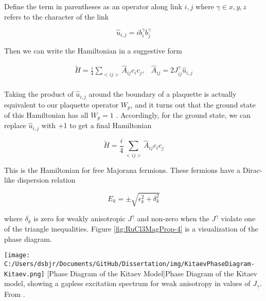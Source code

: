 Define the term in parentheses as an operator along link $i,j$ where $\gamma \in x,y,z$ refers to the character of the link

\begin{equation}
\hat{u}_{i,j} = i b_{i}^{\gamma} b_{j}^{\gamma}
\end{equation}

Then we can write the Hamiltonian in a suggestive form

\begin{equation}
\begin{array}{cc}
	\tilde{H} = \frac{i}{4} \sum_{<ij>} \hat{A}_{ij} c_{i} c_{j}, & \hat{A}_{ij} = 2 J^{\gamma}_{ij}\hat{u}_{i,j} \\
\end{array}
\end{equation}

Taking the product of $\hat{u}_{i,j}$ around the boundary of a plaquette is actually equivalent to our plaquette operator $W_{p}$, and it turns out that the ground state of this Hamiltonian has all $W_{p} = 1$ \cite{Lieb1994}. Accordingly, for the ground state, we can replace $\hat{u}_{i,j}$ with +1 to get a final Hamiltonian

\begin{equation}
\tilde{H} = \frac{i}{4} \sum_{<ij>} \hat{A}_{ij} c_{i} c_{j}
\end{equation}

This is the Hamiltonian for free Majorana fermions. These fermions have a Dirac-like dispersion relation

\begin{equation}
E_{k} = \pm \sqrt{\epsilon_{k}^{2} + \delta_{k}^{2}}
\end{equation}

where $\delta_{k}$ is zero for weakly anisotropic $J^{\gamma}$ and non-zero when the $J^{\gamma}$ violate one of the triangle inequalities. Figure \ref{fig:RuCl3MagProp-4} is a visualization of the phase diagram.

\begin{centering}
\texttt{[image: C:/Users/dsbjr/Documents/GitHub/Dissertation/img/KitaevPhaseDiagram-Kitaev.png]}
  \captionsetup{width=0.75\textwidth}
  [Phase Diagram of the Kitaev Model]{Phase Diagram of the Kitaev model, showing a gapless excitation spectrum for weak anisotropy in values of $J_{\gamma}$. From \cite{Kitaev2006}.} 
  \label{fig:RuCl3MagProp-4}
\end{centering}

